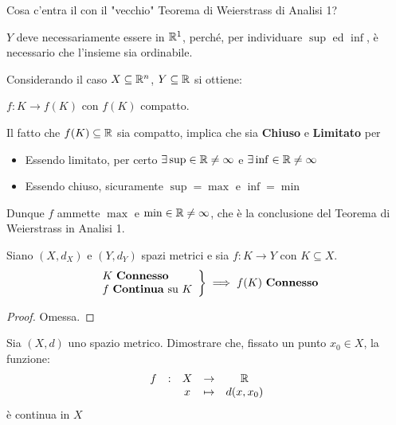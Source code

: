 \begin{exercise}
	\label{ex:weier_analisi_1}
	Cosa c'entra il  con il "vecchio" Teorema di Weierstrass di Analisi 1?
	\begin{solution}
		\begin{note}
			$Y$ deve necessariamente essere in $\mathbb{R}^1$, perché, per individuare $\sup$ ed $\inf$, è necessario che l'insieme sia ordinabile.
		\end{note}
		Considerando il caso $X \subseteq \mathbb{R}^n$, $Y \subseteq \mathbb{R}$ si ottiene:
		\begin{center}
			$f:K \to f(K)$ con $f(K)$ compatto.
		\end{center}
		Il fatto che $f(K) \subseteq \mathbb{R}$ sia compatto, implica che sia \textbf{Chiuso} e \textbf{Limitato} per 
		\begin{itemize}
			\item Essendo limitato, per certo $\exists \sup \in \mathbb{R} \neq \infty$ e $\exists \inf \in \mathbb{R} \neq \infty$
			\item Essendo chiuso, sicuramente $\sup = \max$ e $\inf = \min$
		\end{itemize}
		Dunque $f$ ammette $\max$ e $\min \in \mathbb{R} \neq \infty$, che è la conclusione del Teorema di Weierstrass in Analisi 1.
	\end{solution}
\end{exercise}
\begin{proposition}
	\label{prop:f_di_conn_cont_e_conn}
	Siano $(X,d_X)$ e $(Y,d_Y)$ spazi metrici e sia $f:K \to Y$ con $K \subseteq X$.
	\begin{equation*}
		\left.
		\begin{array}{l}
		K \text{ \textbf{Connesso}} \\
		f \text{ \textbf{Continua} su } K
		\end{array}
		\right\} \implies
		f(K) \text{ \textbf{Connesso}}
	\end{equation*}
	\begin{proof}
		Omessa.
	\end{proof}
\end{proposition}
\begin{exercise}
	Sia $(X,d)$ uno spazio metrico. Dimostrare che, fissato un punto $x_0 \in X$, la funzione:
	\[\begin{array}{ccccc} {f} & : & {X} & \to & {\mathbb{R}} \\ & & {x} & \mapsto & {d(x,x_0)} \\ \end{array}\]
	è continua in $X$
\end{exercise}

